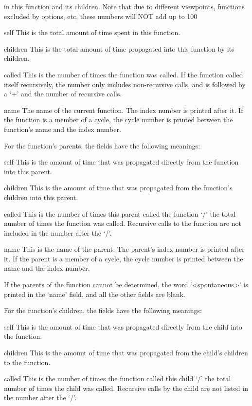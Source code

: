 		in this function and its children.  Note that due to
		different viewpoints, functions excluded by options, etc,
		these numbers will NOT add up to 100%

     self	This is the total amount of time spent in this function.

     children	This is the total amount of time propagated into this
		function by its children.

     called	This is the number of times the function was called.
		If the function called itself recursively, the number
		only includes non-recursive calls, and is followed by
		a `+' and the number of recursive calls.

     name	The name of the current function.  The index number is
		printed after it.  If the function is a member of a
		cycle, the cycle number is printed between the
		function's name and the index number.


 For the function's parents, the fields have the following meanings:

     self	This is the amount of time that was propagated directly
		from the function into this parent.

     children	This is the amount of time that was propagated from
		the function's children into this parent.

     called	This is the number of times this parent called the
		function `/' the total number of times the function
		was called.  Recursive calls to the function are not
		included in the number after the `/'.

     name	This is the name of the parent.  The parent's index
		number is printed after it.  If the parent is a
		member of a cycle, the cycle number is printed between
		the name and the index number.

 If the parents of the function cannot be determined, the word
 `<spontaneous>' is printed in the `name' field, and all the other
 fields are blank.

 For the function's children, the fields have the following meanings:

     self	This is the amount of time that was propagated directly
		from the child into the function.

     children	This is the amount of time that was propagated from the
		child's children to the function.

     called	This is the number of times the function called
		this child `/' the total number of times the child
		was called.  Recursive calls by the child are not
		listed in the number after the `/'.

